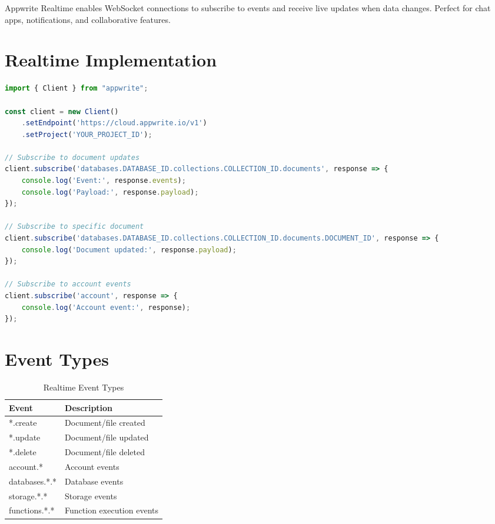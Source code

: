 \documentclass[11pt,a4paper,oneside]{book}
\begin{document}
\begin{keypoint}
Appwrite Realtime enables WebSocket connections to subscribe to events and receive live updates when data changes. Perfect for chat apps, notifications, and collaborative features.
\end{keypoint}

\section{Realtime Implementation}

\begin{lstlisting}[language=JavaScript, caption=Subscribe to Realtime Events]
import { Client } from "appwrite";

const client = new Client()
    .setEndpoint('https://cloud.appwrite.io/v1')
    .setProject('YOUR_PROJECT_ID');

// Subscribe to document updates
client.subscribe('databases.DATABASE_ID.collections.COLLECTION_ID.documents', response => {
    console.log('Event:', response.events);
    console.log('Payload:', response.payload);
});

// Subscribe to specific document
client.subscribe('databases.DATABASE_ID.collections.COLLECTION_ID.documents.DOCUMENT_ID', response => {
    console.log('Document updated:', response.payload);
});

// Subscribe to account events
client.subscribe('account', response => {
    console.log('Account event:', response);
});
\end{lstlisting}

\section{Event Types}

\begin{table}[h]
\centering
\begin{tabularx}{\textwidth}{l X}
\toprule
\textbf{Event} & \textbf{Description} \\
\midrule
*.create & Document/file created \\
*.update & Document/file updated \\
*.delete & Document/file deleted \\
account.* & Account events \\
databases.*.* & Database events \\
storage.*.* & Storage events \\
functions.*.* & Function execution events \\
\bottomrule
\end{tabularx}
\caption{Realtime Event Types}
\end{table}
\end{document}
